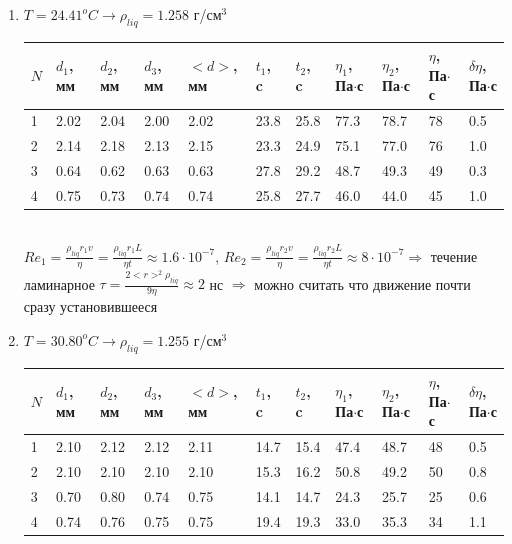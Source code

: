 \documentclass[12 pt, a4paper]{article}%
\begin{document}
\begin{enumerate}
    \item $T = 24.41 ^oC \rightarrow \rho_{liq} = 1.258$ г/см$^3$
    \begin{table}[h!] 
   \begin{center}
    \begin{tabular}{|*{11}{l|}} \hline
     $N$ & $d_1$, мм  & $d_2$, мм & $d_3$, мм & $<d>$, мм & $t_1$, c & $t_2$, c & $\eta_1$, Па$\cdot$с & $\eta_2$, Па$\cdot$с & $\eta$, Па$\cdot$с & $\delta\eta$, Па$\cdot$с \\ \hline
     1 & 2.02 & 2.04 & 2.00 & 2.02 & 23.8 & 25.8 & 77.3 & 78.7 & 78 & 0.5 \\ \hline
     2 & 2.14 & 2.18 & 2.13 & 2.15 & 23.3 & 24.9 & 75.1 & 77.0 & 76 & 1.0\\ \hline
     3 & 0.64 & 0.62 & 0.63 & 0.63 & 27.8 & 29.2 & 48.7 & 49.3 & 49 & 0.3\\
     \hline
     4 & 0.75 & 0.73 & 0.74 & 0.74 & 25.8 & 27.7 & 46.0 & 44.0 & 45 & 1.0\\
     \hline
    \end{tabular}
   \end{center}
  \end{table} \\
  $Re_1 = \frac{\rho_{liq} r_1 v}{\eta} = \frac{\rho_{liq} r_1 L}{\eta t} \approx 1.6\cdot10^{-7} $,
  $Re_2 = \frac{\rho_{liq} r_2 v}{\eta} = \frac{\rho_{liq} r_2 L}{\eta t} \approx 8\cdot10^{-7} \Rightarrow$ течение ламинарное
  $\tau = \frac{2 <r>^2 \rho_{liq}}{9 \eta} \approx 2$ нс $\Rightarrow$ можно считать что движение почти сразу установившееся
  \item $T = 30.80 ^oC \rightarrow \rho_{liq} = 1.255$ г/см$^3$
    \begin{table}[h!] 
   \begin{center}
    \begin{tabular}{|*{11}{l|}} \hline
     $N$ & $d_1$, мм  & $d_2$, мм & $d_3$, мм & $<d>$, мм & $t_1$, c & $t_2$, c & $\eta_1$, Па$\cdot$с & $\eta_2$, Па$\cdot$с & $\eta$, Па$\cdot$с & $\delta\eta$, Па$\cdot$с \\ \hline
     1 & 2.10 & 2.12 & 2.12 & 2.11 & 14.7 & 15.4 & 47.4 & 48.7 & 48 & 0.5 \\ \hline
     2 & 2.10 & 2.10 & 2.10 & 2.10 & 15.3 & 16.2 & 50.8 & 49.2 & 50 & 0.8\\ \hline
     3 & 0.70 & 0.80 & 0.74 & 0.75 & 14.1 & 14.7 & 24.3 & 25.7 & 25 & 0.6\\
     \hline
     4 & 0.74 & 0.76 & 0.75 & 0.75 & 19.4 & 19.3 & 33.0 & 35.3 & 34 & 1.1\\

\end{tabular}
\end{center}
\end{table}
\end{enumerate}
\end{document}
